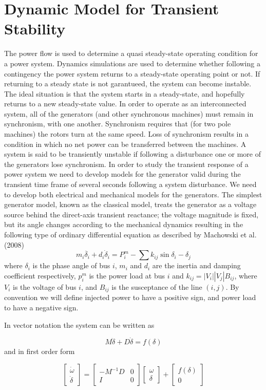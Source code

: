 \section{Dynamic Model for Transient Stability}
The power flow is used to determine a quasi steady-state operating condition for a power system. Dynamics simulations are used to determine whether following a contingency the power system returns to a steady-state operating point or not. If returning to a steady state is not garantueed, the system can  become instable. The ideal situation is that the system starts in a steady-state, and hopefully returns to a new steady-state value.
In order to operate as an interconnected system, all of the generators (and other synchronous machines) must remain in synchronism, with one another. Synchronism requires that (for two pole machines) the rotors turn at the same speed. Loss of synchronism results in a condition in which no net power can be transferred between the machines. A system is said to be transiently unstable if following a disturbance one or more of the generators lose synchronism.
In order to study the transient response of a power system we need to develop models for the generator valid during the transient time frame of several seconds following a system disturbance.
We need to develop both electrical and mechanical models for the generators.
The simplest generator model, known as the classical model, treats the generator as a voltage source behind the direct-axis transient reactance; the voltage magnitude is fixed, but its angle changes according to the mechanical dynamics 
resulting in the following type of ordinary differential equation as described by Machowski et al.
(2008)
\[m_i\ddot{\delta_i}+d_i\dot{\delta}_i=P_i^m-\sum k_{ij}\sin{\delta_i-\delta_j}\]
where $\delta_i$ is the phase angle of bus $i$, $m_i$ and $d_i$ are the inertia and damping coefficient
respectively, $p_i^m$
is the power load at bus $i$ and $k_{ij} = |V_i||V_j|B_{ij}$, where $V_i$ is the voltage of bus $i$, and $B_{ij}$ is the susceptance of the
line $(i, j)$. By convention
we will define injected power to have a positive sign, and power load to have a negative
sign. 

In vector notation the system can be written as

\[M\ddot{\delta}+D\dot{\delta}=f(\delta)\]
and in first order form 

\[\begin{bmatrix} \dot{\omega}\\ \dot{\delta}\end{bmatrix}=
\begin{bmatrix}-M^{-1}D & 0 \\ I & 0\end{bmatrix}\begin{bmatrix}\omega \\ \delta\end{bmatrix}+\begin{bmatrix}f(\delta)\\0\end{bmatrix}\]

